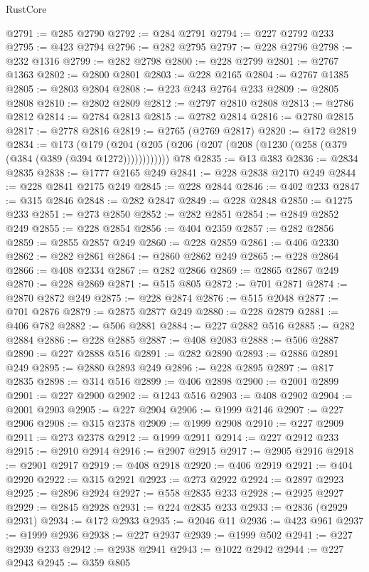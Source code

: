 \begin{lexlean}{RustCore}
\begin{coremodule}
@2791 := @285 @2790
@2792 := @284 @2791
@2794 := @227 @2792 @233
@2795 := @423 @2794
@2796 := @282 @2795
@2797 := @228 @2796
@2798 := @232 @1316
@2799 := @282 @2798
@2800 := @228 @2799
@2801 := @2767 @1363
@2802 := @2800 @2801
@2803 := @228 @2165
@2804 := @2767 @1385
@2805 := @2803 @2804
@2808 := @223 @243 @2764 @233
@2809 := @2805 @2808
@2810 := @2802 @2809
@2812 := @2797 @2810 @2808
@2813 := @2786 @2812
@2814 := @2784 @2813
@2815 := @2782 @2814
@2816 := @2780 @2815
@2817 := @2778 @2816
@2819 := @2765 (@2769 @2817)
@2820 := @172 @2819
@2834 := @173
    (@179 (@204 (@205 (@206 (@207 (@208 (@1230 (@258 (@379 (@384 (@389 (@394 @1272))))))))))))
    @78
@2835 := @13 @383
@2836 := @2834 @2835
@2838 := @1777 @2165 @249
@2841 := @228 @2838 @2170 @249
@2844 := @228 @2841 @2175 @249
@2845 := @228 @2844
@2846 := @402 @233
@2847 := @315 @2846
@2848 := @282 @2847
@2849 := @228 @2848
@2850 := @1275 @233
@2851 := @273 @2850
@2852 := @282 @2851
@2854 := @2849 @2852 @249
@2855 := @228 @2854
@2856 := @404 @2359
@2857 := @282 @2856
@2859 := @2855 @2857 @249
@2860 := @228 @2859
@2861 := @406 @2330
@2862 := @282 @2861
@2864 := @2860 @2862 @249
@2865 := @228 @2864
@2866 := @408 @2334
@2867 := @282 @2866
@2869 := @2865 @2867 @249
@2870 := @228 @2869
@2871 := @515 @805
@2872 := @701 @2871
@2874 := @2870 @2872 @249
@2875 := @228 @2874
@2876 := @515 @2048
@2877 := @701 @2876
@2879 := @2875 @2877 @249
@2880 := @228 @2879
@2881 := @406 @782
@2882 := @506 @2881
@2884 := @227 @2882 @516
@2885 := @282 @2884
@2886 := @228 @2885
@2887 := @408 @2083
@2888 := @506 @2887
@2890 := @227 @2888 @516
@2891 := @282 @2890
@2893 := @2886 @2891 @249
@2895 := @2880 @2893 @249
@2896 := @228 @2895
@2897 := @817 @2835
@2898 := @314 @516
@2899 := @406 @2898
@2900 := @2001 @2899
@2901 := @227 @2900
@2902 := @1243 @516
@2903 := @408 @2902
@2904 := @2001 @2903
@2905 := @227 @2904
@2906 := @1999 @2146
@2907 := @227 @2906
@2908 := @315 @2378
@2909 := @1999 @2908
@2910 := @227 @2909
@2911 := @273 @2378
@2912 := @1999 @2911
@2914 := @227 @2912 @233
@2915 := @2910 @2914
@2916 := @2907 @2915
@2917 := @2905 @2916
@2918 := @2901 @2917
@2919 := @408 @2918
@2920 := @406 @2919
@2921 := @404 @2920
@2922 := @315 @2921
@2923 := @273 @2922
@2924 := @2897 @2923
@2925 := @2896 @2924
@2927 := @558 @2835 @233
@2928 := @2925 @2927
@2929 := @2845 @2928
@2931 := @224 @2835 @233
@2933 := @2836 (@2929 @2931)
@2934 := @172 @2933
@2935 := @2046 @11
@2936 := @423 @961
@2937 := @1999 @2936
@2938 := @227 @2937
@2939 := @1999 @502
@2941 := @227 @2939 @233
@2942 := @2938 @2941
@2943 := @1022 @2942
@2944 := @227 @2943
@2945 := @359 @805

\end{coremodule}
\end{lexlean}

